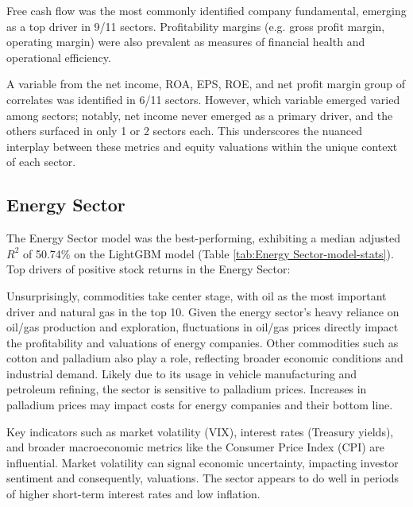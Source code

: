 \documentclass[12pt,a4paper,english]{article}
\begin{document}
Free cash flow was the most commonly identified company fundamental, emerging as a top driver in 9/11 sectors. Profitability margins (e.g. gross profit margin, operating margin) were also prevalent as measures of financial health and operational efficiency.

A variable from the net income, ROA, EPS, ROE, and net profit margin group of correlates was identified in 6/11 sectors. However, which variable emerged varied among sectors; notably, net income never emerged as a primary driver, and the others surfaced in only 1 or 2 sectors each. This underscores the nuanced interplay between these metrics and equity valuations within the unique context of each sector.

\subsection{Energy Sector}
\label{sec:energy}

The Energy Sector model was the best-performing, exhibiting a median adjusted $R^2$ of 50.74\% on the LightGBM model (Table \ref{tab:Energy Sector-model-stats}). Top drivers of positive stock returns in the Energy Sector:


Unsurprisingly, commodities take center stage, with oil as the most important driver and natural gas in the top 10. Given the energy sector's heavy reliance on oil/gas production and exploration, fluctuations in oil/gas prices directly impact the profitability and valuations of energy companies. Other commodities such as cotton and palladium also play a role, reflecting broader economic conditions and industrial demand. Likely due to its usage in vehicle manufacturing and petroleum refining, the sector is sensitive to palladium prices. Increases in palladium prices may impact costs for energy companies and their bottom line.

Key indicators such as market volatility (VIX), interest rates (Treasury yields), and broader macroeconomic metrics like the Consumer Price Index (CPI) are influential. Market volatility can signal economic uncertainty, impacting investor sentiment and consequently, valuations. The sector appears to do well in periods of higher short-term interest rates and low inflation.
\end{document}
